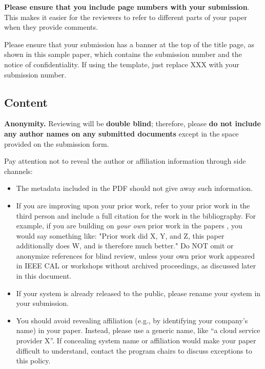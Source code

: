 \documentclass[pageno]{jpaper}
\begin{document}
\textbf{Please ensure that you include page numbers with your
submission}. This makes it easier for the reviewers to refer to different
parts of your paper when they provide comments.

Please ensure that your submission has a banner at the top of the title
page, as shown in
this
sample paper, which contains the submission number and the notice of
confidentiality.  If using the template, just replace XXX with your
submission number.



\subsection{Content}

\noindent\textbf{Anonymity.}  Reviewing will be \textbf{double blind};
therefore, please \textbf{do not include any author names on any submitted
documents} except in the space provided on the submission form.  

Pay attention not to reveal the author or affiliation information through
side channels:

\begin{itemize}
\item The metadata included in the PDF should not give away such
information. 

\item If you are improving upon your prior work, refer to your prior
work in the third person and include a full citation for the work in the
bibliography.  For example, if you are building on {\em your own} prior
work in the papers \cite{nicepaper1,nicepaper2,nicepaper3}, you would say
something like: "Prior work
\cite{nicepaper1,nicepaper2,nicepaper3} did X, Y, and Z, this paper
additionally does W, and is therefore much better."  Do NOT omit or
anonymize references for blind review, unless
your own prior work appeared in IEEE CAL or workshops without archived
proceedings, as discussed later in this document.

\item If your system is already released to the public, please rename your system in your submission.

\item You should avoid revealing affiliation (e.g., by identifying your company’s name) in your paper. Instead, please use a generic name, like “a cloud service provider X”.  
If concealing system name or affiliation would make your paper difficult to understand, contact the program chairs to discuss exceptions to this policy.
\end{itemize}
\end{document}

